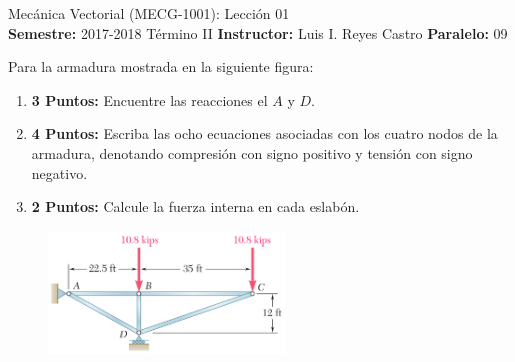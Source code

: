 \documentclass[ a4paper, twoside, 11pt]{article}
\newcommand{\numero}{01}
\begin{document}
\allowdisplaybreaks

\begin{center}
\Large Mec\'anica Vectorial (MECG-1001): Lecci\'on \numero \\[2ex]
\small \textbf{Semestre:} 2017-2018 T\'ermino II \qquad
\textbf{Instructor:} Luis I. Reyes Castro \qquad
\textbf{Paralelo:} 09
\end{center}
\fullskip

\begin{problem}
Para la armadura mostrada en la siguiente figura:
\begin{enumerate}[label=\textbf{\alph*)}]
\item \textbf{3 Puntos:} Encuentre las reacciones el $A$ y $D$. 
\item \textbf{4 Puntos:} Escriba las ocho ecuaciones asociadas con los cuatro nodos de la armadura, denotando compresi\'on con signo positivo y tensi\'on con signo negativo. 
\item \textbf{2 Puntos:} Calcule la fuerza interna en cada eslab\'on. 
\end{enumerate}

\begin{figure}[htb]
\centering
\includegraphics[width=0.56\textwidth]{prob-armadura.jpg}
\end{figure}

\end{problem}
\fullskip
\end{document}
